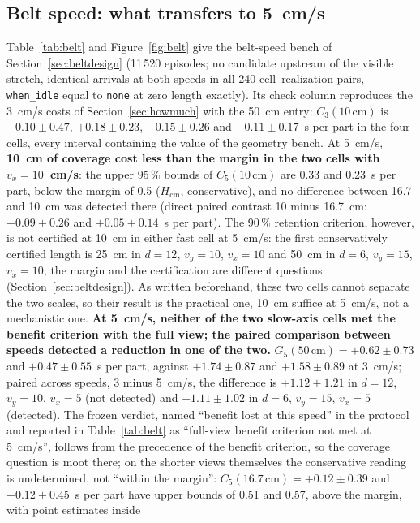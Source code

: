 \documentclass[11pt,a4paper]{article}
\begin{document}
\subsection{Belt speed: what transfers to 5~cm/s}\label{sec:belt}
Table~\ref{tab:belt} and Figure~\ref{fig:belt} give the belt-speed bench of
Section~\ref{sec:beltdesign} (11\,520 episodes; no candidate upstream of the visible
stretch, identical arrivals at both speeds in all 240 cell--realization pairs,
\texttt{when\_idle} equal to \texttt{none} at zero length exactly). Its check column
reproduces the 3~cm/s costs of Section~\ref{sec:howmuch} with the 50~cm entry: $C_3(10\,
\mathrm{cm})$ is $+0.10\pm0.47$, $+0.18\pm0.23$, $-0.15\pm0.26$ and $-0.11\pm0.17$~s per
part in the four cells, every interval containing the value of the geometry bench. At
5~cm/s, \textbf{10~cm of coverage cost less than the margin in the two cells with
$v_x=10$~cm/s}: the upper 95\,\% bounds of $C_5(10\,\mathrm{cm})$ are 0.33 and 0.23~s per
part, below the margin of 0.5 ($H_{\mathrm{cm}}$, conservative), and no difference
between 16.7 and 10~cm was detected there (direct paired contrast 10 minus 16.7~cm:
$+0.09\pm0.26$ and $+0.05\pm0.14$~s per part). The 90\,\% retention criterion, however,
is not certified at 10~cm in either fast cell at 5~cm/s: the first conservatively
certified length is 25~cm in $d=12$, $v_y=10$, $v_x=10$ and 50~cm in $d=6$, $v_y=15$,
$v_x=10$; the margin and the certification are different questions
(Section~\ref{sec:beltdesign}). As written beforehand, these two cells cannot separate the two scales,
so their result is the practical one, 10~cm suffice at 5~cm/s, not a mechanistic one.
\textbf{At 5~cm/s, neither of the two slow-axis cells met the benefit criterion with
the full view; the paired comparison between speeds detected a reduction in one of the
two.} $G_5(50\,\mathrm{cm})=+0.62\pm0.73$ and $+0.47\pm0.55$~s per part, against
$+1.74\pm0.87$ and $+1.58\pm0.89$ at 3~cm/s; paired across speeds, 3 minus 5~cm/s, the
difference is $+1.12\pm1.21$ in $d=12$, $v_y=10$, $v_x=5$ (not detected) and
$+1.11\pm1.02$ in $d=6$, $v_y=15$, $v_x=5$ (detected). The frozen verdict, named ``benefit lost at this speed'' in the protocol and reported
in Table~\ref{tab:belt} as ``full-view benefit criterion not met at 5~cm/s'', follows
from the precedence of the benefit criterion, so the coverage question
is moot there; on the shorter views themselves the conservative reading is undetermined,
not ``within the margin'': $C_5(16.7\,\mathrm{cm})=+0.12\pm0.39$ and $+0.12\pm0.45$~s per
part have upper bounds of 0.51 and 0.57, above the margin, with point estimates inside
\end{document}
